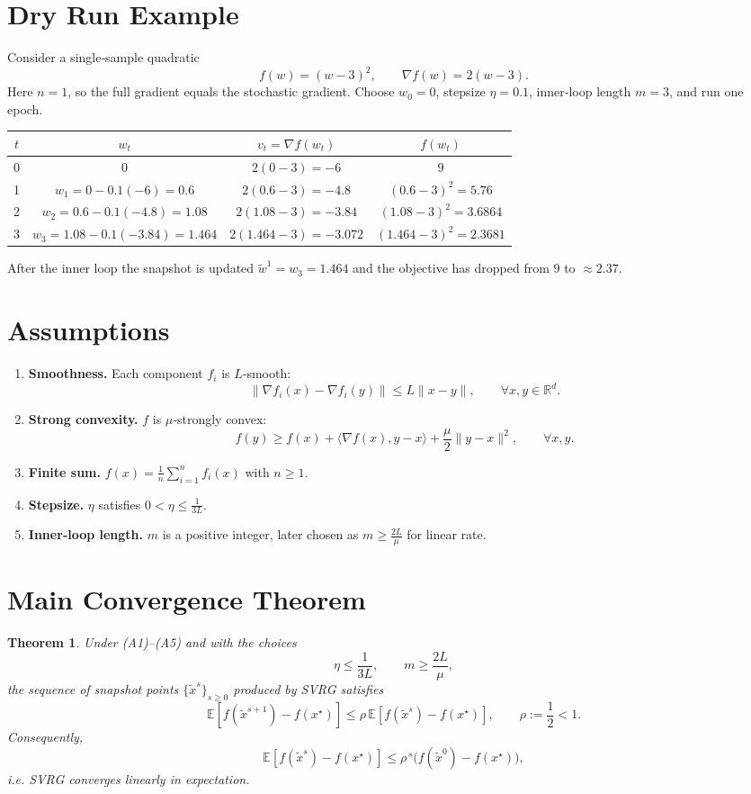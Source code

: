 \documentclass{article}
\newtheorem{theorem}{Theorem}
\begin{document}
\section*{Dry Run Example}
Consider a single‑sample quadratic
\[
f(w)=(w-3)^2,\qquad \nabla f(w)=2(w-3).
\]
Here $n=1$, so the full gradient equals the stochastic gradient.  
Choose $w_0=0$, stepsize $\eta=0.1$, inner‑loop length $m=3$, and run one epoch.

\begin{center}
\begin{tabular}{c|c|c|c}
$t$ & $w_t$ & $v_t=\nabla f(w_t)$ & $f(w_t)$ \\ \hline
0 & $0$ & $2(0-3)=-6$ & $9$ \\
1 & $w_1=0-0.1(-6)=0.6$ & $2(0.6-3)=-4.8$ & $(0.6-3)^2=5.76$ \\
2 & $w_2=0.6-0.1(-4.8)=1.08$ & $2(1.08-3)=-3.84$ & $(1.08-3)^2=3.6864$ \\
3 & $w_3=1.08-0.1(-3.84)=1.464$ & $2(1.464-3)=-3.072$ & $(1.464-3)^2=2.3681$ \\
\end{tabular}
\end{center}
After the inner loop the snapshot is updated $\tilde{w}^{1}=w_3=1.464$ and the objective has dropped from $9$ to $\approx2.37$.

\newpage
\section*{Assumptions}
\begin{enumerate}
\item \textbf{Smoothness.} Each component $f_i$ is $L$‑smooth:
\[
\|\nabla f_i(x)-\nabla f_i(y)\|\le L\|x-y\|,\qquad\forall x,y\in\mathbb{R}^d.
\tag{A1}
\]
\item \textbf{Strong convexity.} $f$ is $\mu$‑strongly convex:
\[
f(y)\ge f(x)+\langle\nabla f(x),y-x\rangle+\frac{\mu}{2}\|y-x\|^2,
\qquad\forall x,y.
\tag{A2}
\]
\item \textbf{Finite sum.} $f(x)=\frac1n\sum_{i=1}^n f_i(x)$ with $n\ge 1$.
\item \textbf{Stepsize.} $\eta$ satisfies $0<\eta\le \frac{1}{3L}$.
\item \textbf{Inner‑loop length.} $m$ is a positive integer, later chosen as $m\ge \frac{2L}{\mu}$ for linear rate.
\end{enumerate}

\section*{Main Convergence Theorem}
\begin{theorem}
\label{thm:linear}
Under (A1)–(A5) and with the choices
\[
\eta\le\frac{1}{3L},\qquad m\ge\frac{2L}{\mu},
\]
the sequence of snapshot points $\{\tilde{x}^{s}\}_{s\ge0}$ produced by SVRG satisfies
\[
\mathbb{E}\!\left[f(\tilde{x}^{s+1})-f(x^{\star})\right]
\le\rho\,
\mathbb{E}\!\left[f(\tilde{x}^{s})-f(x^{\star})\right],
\qquad
\rho:=\frac{1}{2}<1 .
\]
Consequently,
\[
\mathbb{E}\!\left[f(\tilde{x}^{s})-f(x^{\star})\right]\le\rho^{\,s}\bigl(f(\tilde{x}^{0})-f(x^{\star})\bigr),
\]
i.e. SVRG converges \emph{linearly} in expectation.
\end{theorem}
\end{document}
